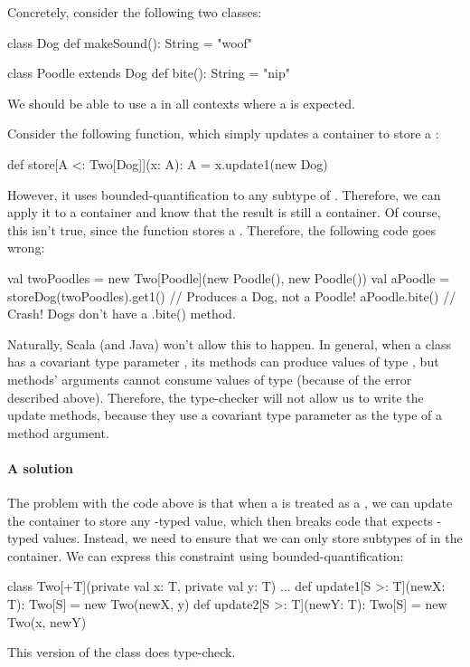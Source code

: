 \documentclass{book}
\begin{document}
Concretely, consider the following two classes:
\begin{scalacode}
class Dog {
  def makeSound(): String = "woof"
}

class Poodle extends Dog {
  def bite(): String = "nip"
}
\end{scalacode}

We should be able to use a  in all contexts where
a  is expected.


Consider the following function, which simply updates a container to
store a :
\begin{scalacode}
def store[A <: Two[Dog]](x: A): A = x.update1(new Dog)
\end{scalacode}
However, it uses bounded-quantification to any subtype of
. Therefore, we can apply it to a 
container and know that the result is still a 
container. Of course, this isn't true, since the function stores
a . Therefore, the following code goes wrong:
\begin{scalacode}
val twoPoodles = new Two[Poodle](new Poodle(), new Poodle())
val aPoodle = storeDog(twoPoodles).get1() // Produces a Dog, not a Poodle!
aPoodle.bite() // Crash! Dogs don't have a .bite() method.
\end{scalacode}

Naturally, Scala (and Java) won't allow this to happen. In general, when
a class has a covariant type parameter , its methods can
produce values of type , but methods' arguments cannot consume
values of type  (because of the error described above). Therefore, the type-checker
will not allow us to write the update methods, because they use
a covariant type parameter as the type of a method argument.

\paragraph{A solution}
The problem with the code above is that when a 
is treated as a , we can update the container to
store any -typed value, which then breaks code that expects
-typed values. Instead, we need to ensure that we can only store
subtypes of  in the container. We can express this constraint
using bounded-quantification:

\begin{scalacode}
class Two[+T](private val x: T, private val y: T) {
  ...
  def update1[S >: T](newX: T): Two[S] = new Two(newX, y)
  def update2[S >: T](newY: T): Two[S] = new Two(x, newY)
}
\end{scalacode}
This version of the class does type-check.
\end{document}
